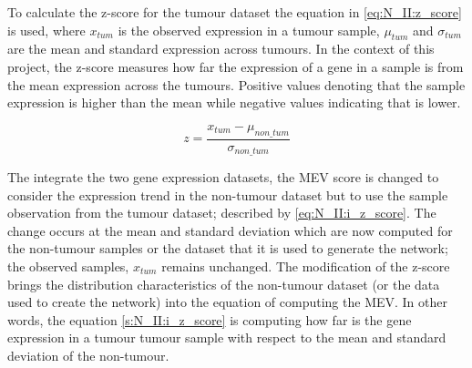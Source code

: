 To calculate the z-score for the tumour dataset the equation in \cref{eq:N_II:z_score} is used, where $x_{tum}$ is the observed expression in a tumour sample, $\mu_{tum}$ and $\sigma_{tum}$ are the mean and standard expression across tumours. In the context of this project, the z-score measures how far the expression of a gene in a sample is from the mean expression across the tumours. Positive values denoting that the sample expression is higher than the mean while negative values indicating that is lower.


\begin{equation} \label{eq:N_II:i_z_score}
z = \frac{x_{tum} - \mu_{non\_tum}}{\sigma_{non\_tum}}
\end{equation}

The integrate the two gene expression datasets, the MEV score is changed to consider the expression trend in the non-tumour dataset but to use the sample observation from the tumour dataset; described by \cref{eq:N_II:i_z_score}. The change occurs at the mean and standard deviation which are now computed for the non-tumour samples or the dataset that it is used to generate the network; the observed samples, $x_{tum}$ remains unchanged. The modification of the z-score brings the distribution characteristics of the non-tumour dataset (or the data used to create the network) into the equation of computing the MEV. In other words, the equation \cref{s:N_II:i_z_score} is computing how far is the gene expression in a tumour tumour sample with respect to the mean and standard deviation of the non-tumour.



